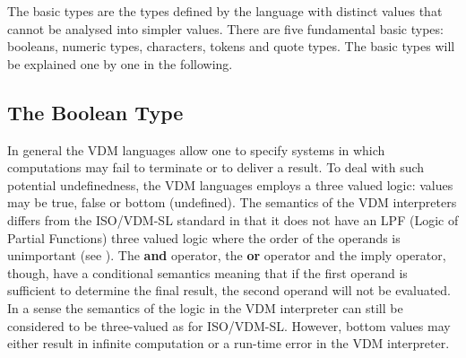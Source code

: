 \documentclass{overturerepchap}
\newcommand{\keyw}[1]{{\bf\ttfamily #1}}
\begin{document}
The basic types are the types defined by the language with distinct
values that cannot be analysed into simpler values. There are five
fundamental basic types: booleans, numeric types,
characters, tokens and quote types. The basic types will be explained one by
one in the following.

\subsection{The Boolean Type}\label{bool}

In general the VDM languages allow one to specify systems in
which computations may fail to terminate or to deliver a result. To
deal with such potential undefinedness, 
the VDM languages employs a three valued logic: values may be
true, false or bottom (undefined). 
The semantics of the VDM interpreters differs from the ISO/VDM-SL standard
in that it does
not have an LPF (Logic of Partial Functions) three valued logic where
the order of the operands is  
unimportant (see \cite{Jones90a}).  The \keyw{and} operator, the
\keyw{or} operator and the imply operator, though, have a conditional
semantics meaning that if the first operand is sufficient to determine
the final result, the second operand will not be evaluated. In a sense
the semantics of the logic in the VDM interpreter can still be considered
to be three-valued as for ISO/VDM-SL. However, bottom values may
either result in infinite computation or a run-time error in the
VDM interpreter.
\end{document}
